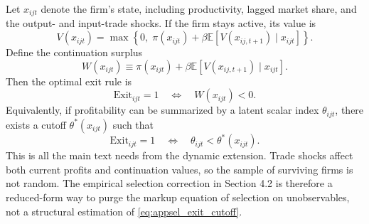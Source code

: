 Let $x_{ijt}$ denote the firm's state, including productivity, lagged market share, and the output- and input-trade shocks. If the firm stays active, its value is
\begin{equation}
V(x_{ijt})
=
\max
\left\{
0,\;
\pi(x_{ijt}) + \beta \mathbb{E}\left[V(x_{ij,t+1}) \mid x_{ijt}\right]
\right\}.
\label{eq:appsel_bellman}
\end{equation}
Define the continuation surplus
\[
W(x_{ijt})
\equiv
\pi(x_{ijt}) + \beta \mathbb{E}\left[V(x_{ij,t+1}) \mid x_{ijt}\right].
\]
Then the optimal exit rule is
\begin{equation}
\text{Exit}_{ijt}=1
\quad \Longleftrightarrow \quad
W(x_{ijt})<0.
\label{eq:appsel_exit_rule}
\end{equation}
Equivalently, if profitability can be summarized by a latent scalar index $\theta_{ijt}$, there exists a cutoff $\theta^*(x_{ijt})$ such that
\begin{equation}
\text{Exit}_{ijt}=1
\quad \Longleftrightarrow \quad
\theta_{ijt}<\theta^*(x_{ijt}).
\label{eq:appsel_exit_cutoff}
\end{equation}
This is all the main text needs from the dynamic extension. Trade shocks affect both current profits and continuation values, so the sample of surviving firms is not random. The empirical selection correction in Section 4.2 is therefore a reduced-form way to purge the markup equation of selection on unobservables, not a structural estimation of \eqref{eq:appsel_exit_cutoff}.
